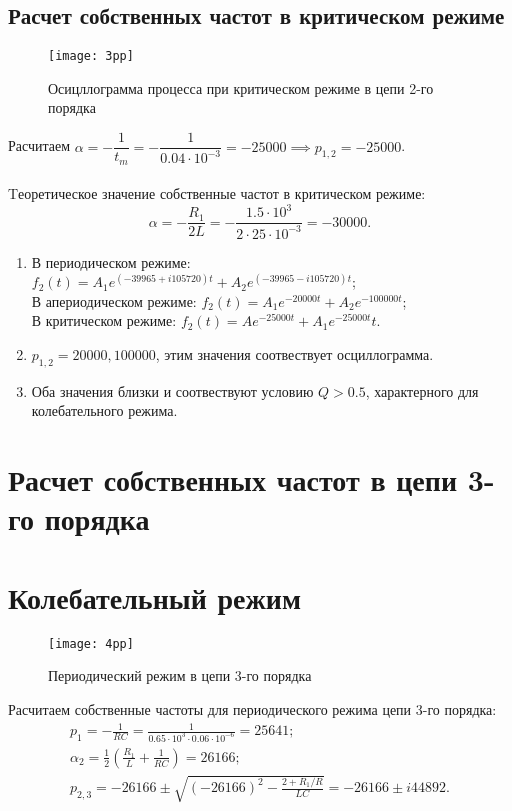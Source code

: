 \documentclass[a4paper,14pt ]{article} %
\begin{document}
\subsection{Расчет собственных частот в критическом режиме}
\begin{figure}[H]
    \texttt{[image: 3pp]}
    \centering
    \caption{Осицллограмма процесса при критическом режиме в цепи 2-го порядка}
\end{figure}
Расчитаем $\alpha = -\dfrac1{t_m} = -\dfrac1{0.04\cdot10^{-3}}= -25000 \implies p_{1,2} = -25000$. 
\\\\ \indent Tеоретическое значение собственные частот в критическом режиме:
\begin{equation*}
    \alpha = -\frac{R_1}{2L} = -\frac{1.5\cdot10^3}{2\cdot25\cdot10^{-3}} = -30000.
\end{equation*}
\begin{enumerate}
    \item В периодическом режиме: $f_2(t) = A_1e^{(-39965 + i105720)t} + A_2e^{(-39965 - i105720)t}$;
    \\В апериодическом режиме: $f_2(t) = A_1e^{-20000t} + A_2e^{-100000t}$;
    \\В критическом режиме: $f_2(t) = Ae^{-25000t} + A_1e^{-25000t}t$.
    \item $p_{1,2} = 20000, 100000$, этим значения соотвествует осциллограмма.
    \item Оба значения близки и соотвествуют условию $Q > 0.5$, характерного для колебательного режима.
 \end{enumerate}    
\section{Расчет собственных частот в цепи 3-го порядка}
\section{Колебательный режим} 
\begin{figure}[H]
    \texttt{[image: 4pp]}
    \centering
    \caption{Периодический режим в цепи 3-го порядка}
\end{figure}
Расчитаем собственные частоты для периодического режима цепи 3-го порядка:
\begin{multline*}
    p_1 = -\frac{1}{RC} = \frac{1}{0.65\cdot10^3\cdot0.06\cdot10^{-6}} = 25641;
\\ \alpha_2 = \frac12\left(\frac{R_1}L + \frac1{RC}\right) = 26166;
\\ 
p_{2,3} = -26166 \pm \sqrt{(-26166)^2 - \frac{2 + R_1/R}{LC}}= -26166 \pm i44892.
\end{multline*}
\end{document}
